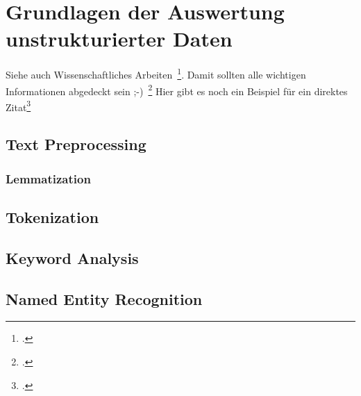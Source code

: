 \newpage
\section{Grundlagen der Auswertung unstrukturierter Daten} \label{infos}
Siehe auch Wissenschaftliches Arbeiten~\footcite[\vglf][S. 1]{Balzert.2008}. %
Damit sollten alle wichtigen Informationen abgedeckt sein ;-)~\footcite[\vglf][]{Balzert.2008} %
Hier gibt es noch ein Beispiel für ein direktes Zitat\footcite[][]{Balzert.2008} %

\subsection{Text Preprocessing}
\subsubsection{Lemmatization}
\subsection{Tokenization}
\subsection{Keyword Analysis}
\subsection{Named Entity Recognition}